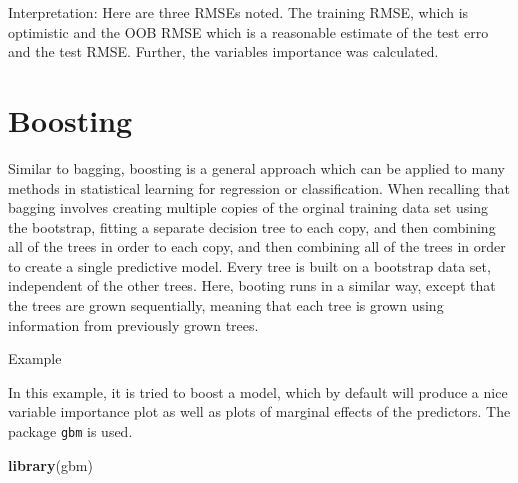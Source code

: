 \documentclass[]{report}
\newenvironment{Shaded}{\begin{snugshade}}{\end{snugshade}}
\newcommand{\KeywordTok}[1]{\textcolor[rgb]{0.13,0.29,0.53}{\textbf{#1}}}
\newcommand{\DataTypeTok}[1]{\textcolor[rgb]{0.13,0.29,0.53}{#1}}
\newcommand{\StringTok}[1]{\textcolor[rgb]{0.31,0.60,0.02}{#1}}
\newcommand{\CommentTok}[1]{\textcolor[rgb]{0.56,0.35,0.01}{\textit{#1}}}
\newcommand{\OperatorTok}[1]{\textcolor[rgb]{0.81,0.36,0.00}{\textbf{#1}}}
\newcommand{\NormalTok}[1]{#1}
\begin{document}
\begin{Shaded}
\end{Shaded}

Interpretation: Here are three RMSEs noted. The training RMSE, which is
optimistic and the OOB RMSE which is a reasonable estimate of the test
erro and the test RMSE. Further, the variables importance was
calculated.

\section{Boosting}\label{boosting}

Similar to bagging, boosting is a general approach which can be applied
to many methods in statistical learning for regression or
classification. When recalling that bagging involves creating multiple
copies of the orginal training data set using the bootstrap, fitting a
separate decision tree to each copy, and then combining all of the trees
in order to each copy, and then combining all of the trees in order to
create a single predictive model. Every tree is built on a bootstrap
data set, independent of the other trees. Here, booting runs in a
similar way, except that the trees are grown sequentially, meaning that
each tree is grown using information from previously grown trees.

Example

In this example, it is tried to boost a model, which by default will
produce a nice variable importance plot as well as plots of marginal
effects of the predictors. The package \texttt{gbm} is used.

\begin{Shaded}
\begin{Highlighting}[]
\KeywordTok{library}\NormalTok{(gbm)}
\end{Highlighting}
\end{Shaded}
\end{document}

